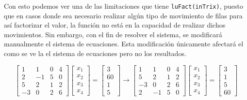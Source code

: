 \documentclass[english,notitlepage,letterpaper, 10pt]{article} %
\begin{document}
\begin{enumerate}
\begin{enumerate}
          Con esto podemos ver una de las limitaciones que tiene \texttt{luFact(inTrix)}, puesto que en casos donde sea necesario realizar algún tipo de movimiento de filas para así factorizar el valor, la función no está en la capacidad de realizar dichos movimientos. Sin embargo, con el fin de resolver el sistema, se modificará manualmente el sistema de ecuaciones. Esta modificación únicamente afectará el como se ve la el sistema de ecuaciones pero no los resultados.

          \begin{displaymath}
            \begin{bmatrix}
              1 & 1 & 0 & 4 \\
              2 & -1 & 5 & 0 \\
              5 & 2 & 1 & 2 \\
              -3 & 0 & 2 & 6
            \end{bmatrix}
            \begin{bmatrix}
              x_1 \\
              x_2 \\
              x_3 \\
              x_4 
            \end{bmatrix}
            =
            \begin{bmatrix}
              3 \\
              60 \\
              1 \\
              5
            \end{bmatrix}
            \longrightarrow
            \begin{bmatrix}
              1 & 1 & 0 & 4 \\
              5 & 2 & 1 & 2 \\
              -3 & 0 & 2 & 6 \\
              2 & -1 & 5 & 0 
            \end{bmatrix}
            \begin{bmatrix}
              x_1 \\
              x_2 \\
              x_3 \\
              x_4 
            \end{bmatrix}
            =
            \begin{bmatrix}
              3 \\
              1 \\
              5 \\
              60 
            \end{bmatrix}
          \end{displaymath}


\end{enumerate}
\end{enumerate}
\end{document}
